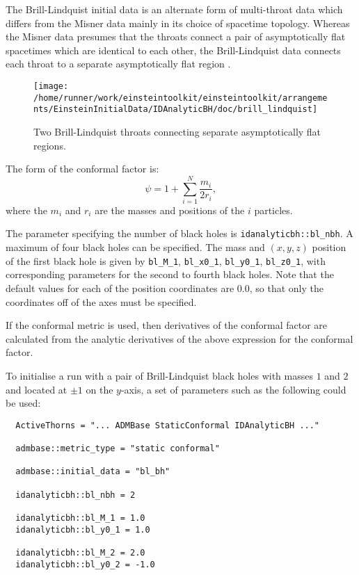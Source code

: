 \documentclass{article}
\begin{document}
The Brill-Lindquist initial data is an alternate form of multi-throat
data which differs from the Misner data mainly in its choice of
spacetime topology. Whereas the Misner data presumes that the throats
connect a pair of asymptotically flat spacetimes which are identical
to each other, the Brill-Lindquist data connects each throat to a
separate asymptotically flat region \cite{CactusEinstein_IDAnalyticBH_brill-lindquist:1963}.
\begin{figure}
  \centering
  \texttt{[image: /home/runner/work/einsteintoolkit/einsteintoolkit/arrangements/EinsteinInitialData/IDAnalyticBH/doc/brill\_lindquist]}
  \caption{Two Brill-Lindquist throats connecting separate
    asymptotically flat regions.}
\end{figure}
The form of the conformal factor is:
\begin{equation}
  \psi = 1 + \sum_{i=1}^N \frac{m_i}{2r_i},
\end{equation}
where the $m_i$ and $r_i$ are the masses and positions of the $i$
particles.

The parameter specifying the number of black holes is
\texttt{idanalyticbh::bl\_nbh}. A maximum of four black holes can be
specified. The mass and $(x,y,z)$ position of the first black hole is
given by \texttt{bl\_M\_1}, \texttt{bl\_x0\_1}, \texttt{bl\_y0\_1},
\texttt{bl\_z0\_1}, with corresponding parameters for the second to
fourth black holes. Note that the default values for each of the
position coordinates are $0.0$, so that only the coordinates off
of the axes must be specified.

If the conformal metric is used, then derivatives of the conformal
factor are calculated from the analytic derivatives of the above
expression for the conformal factor.

To initialise a run with a pair of Brill-Lindquist black holes with
masses $1$ and $2$ and located at $\pm 1$ on the $y$-axis, a set of
parameters such as the following could be used:
\begin{verbatim}
  ActiveThorns = "... ADMBase StaticConformal IDAnalyticBH ..."

  admbase::metric_type = "static conformal"

  admbase::initial_data = "bl_bh"

  idanalyticbh::bl_nbh = 2

  idanalyticbh::bl_M_1 = 1.0
  idanalyticbh::bl_y0_1 = 1.0

  idanalyticbh::bl_M_2 = 2.0
  idanalyticbh::bl_y0_2 = -1.0
\end{verbatim}
\end{document}
